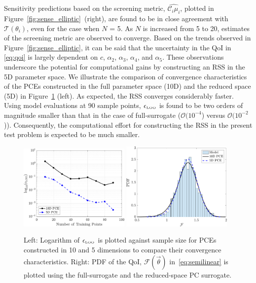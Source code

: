 %
Sensitivity predictions based on the screening metric, $\widehat{\mathcal{C}_i\mu_i}$,
plotted in Figure~\ref{fig:sense_elliptic}~(right), are found to
be in close agreement with $\mathcal{T}(\theta_i)$, even for the case when $N$ = 5. As $N$
is increased from 5 to 20, estimates of the screening metric are observed to converge.
Based on the trends observed in Figure~\ref{fig:sense_elliptic}, it can be said that
the uncertainty in the QoI in \eqref{eq:qoi} is largely dependent on $c$, 
$\alpha_2$, $\alpha_3$, $\alpha_4$, and $\alpha_5$. These observations underscore the
potential for computational gains by constructing an RSS in the 5D parameter space. We 
illustrate the comparison of convergence characteristics of the PCEs constructed in the
full parameter space (10D) and the reduced space (5D) in Figure~\ref{fig:conv_elliptic} (left). 
As expected, the RSS converges considerably faster. Using model evaluations at 90
sample points, $\epsilon_{\mbox{\tiny{LOO}}}$ is found to be two orders of magnitude
smaller than that in the case of full-surrogate ($\mathcal{O}(10^{-4}$) versus
$\mathcal{O}(10^{-2}$)). 
Consequently, the computational effort for constructing the RSS in the present test problem
is expected to be much smaller. 
%
\begin{figure}[htbp]
 \begin{center}
  \includegraphics[width=0.48\textwidth]{./Figures/err_samples_elliptic}
  \includegraphics[width=0.48\textwidth]{./Figures/pdf_comp_elliptic}
\caption{Left: Logarithm of $\epsilon_{\mbox{\tiny{LOO}}}$ is plotted against sample size for 
PCEs constructed in 10 and 5 dimensions to compare their convergence characteristics. 
Right: PDF of the QoI, $\mathcal{F}(\vec\theta)$ in~\eqref{eq:semilinear} is
plotted using the full-surrogate and the reduced-space PC surrogate.}
\label{fig:conv_elliptic}
\end{center}
\end{figure}

